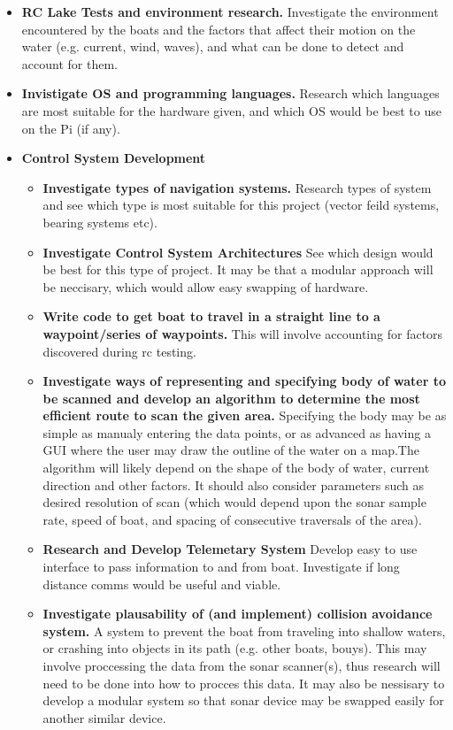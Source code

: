 \documentclass[titlepage 12pt]{article}
\begin{document}
{\begin{itemize}
\item \textbf{RC Lake Tests and environment research.} Investigate the environment encountered by the boats and the factors that affect their motion on the water (e.g. current, wind, waves), and what can be done to detect and account for them.

\item \textbf{Invistigate OS and programming languages.} Research which languages are most suitable for the hardware given, and which OS would be best to use on the Pi (if any). 

\item \textbf{Control System Development} 
	\begin{itemize}
	\item \textbf{Investigate types of navigation systems.} Research types of system and see which type is most suitable for this project (vector feild systems, bearing systems etc). 
	\item \textbf{Investigate Control System Architectures} See which design would be best for this type of project. It may be that a modular approach will be neccisary, which would allow easy swapping of hardware.
	\item \textbf{Write code to get boat to travel in a straight line to a waypoint/series of waypoints.} This will involve accounting for factors discovered during rc testing.
	\item \textbf{Investigate ways of representing and specifying body of water to be scanned and develop an algorithm to determine the most efficient route to scan the given area.} Specifying the body may be as simple as manualy entering the data points, or as advanced as having a GUI where the user may draw the outline of the water on a map.The algorithm will likely depend on the shape of the body of water, current direction and other factors. It should also consider parameters such as desired resolution of scan (which would depend upon the sonar sample rate, speed of boat, and spacing of consecutive traversals of the area).
	\item \textbf{Research and Develop Telemetary System} Develop easy to use interface to pass information to and from boat. Investigate if long distance comms would be useful and viable.
	\item \textbf{Investigate plausability of (and implement) collision avoidance system.} A system to prevent the boat from traveling into shallow waters, or crashing into objects in its path (e.g. other boats, bouys). This may involve proccessing the data from the sonar scanner(s), thus research will need to be done into how to procces this data. It may also be nessisary to develop a modular system so that sonar device may be swapped easily for another similar device.
	\end{itemize}


\end{itemize}}
\end{document}

